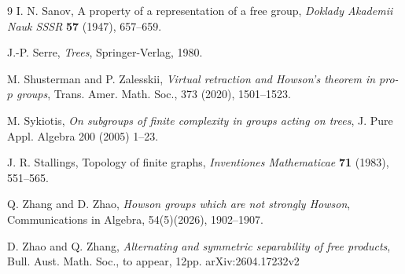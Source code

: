 \documentclass[]{amsart}
\newtheorem*{fixed point criterion}{\fixed point criterion}
\theoremstyle{definition}
\theoremstyle{remark}
\numberwithin{equation}{section}
\begin{document}
\begin{thebibliography}{9}
I. N. Sanov,
\newblock A property of a representation of a free group,
\newblock \emph{Doklady Akademii Nauk SSSR} \textbf{57} (1947), 657--659.

J.-P. Serre,
\newblock \emph{Trees},
\newblock Springer-Verlag, 1980.

 M. Shusterman and P. Zalesskii, \textit{Virtual retraction and Howson's theorem in pro-$p$ groups}, Trans. Amer. Math. Soc., 373 (2020), 1501--1523.

 M. Sykiotis, \textit{On subgroups of finite complexity in groups acting on trees}, J. Pure Appl. Algebra 200 (2005) 1--23.

J. R. Stallings,
\newblock Topology of finite graphs,
\newblock \emph{Inventiones Mathematicae} \textbf{71} (1983), 551--565.

 Q. Zhang and D. Zhao, \textit{Howson groups which are not strongly Howson}, Communications in Algebra, 54(5)(2026), 1902--1907.

 D. Zhao and Q. Zhang, \textit{ Alternating and symmetric separability of free products}, Bull. Aust. Math. Soc., to appear, 12pp.  arXiv:2604.17232v2
\end{thebibliography}
\end{document}

